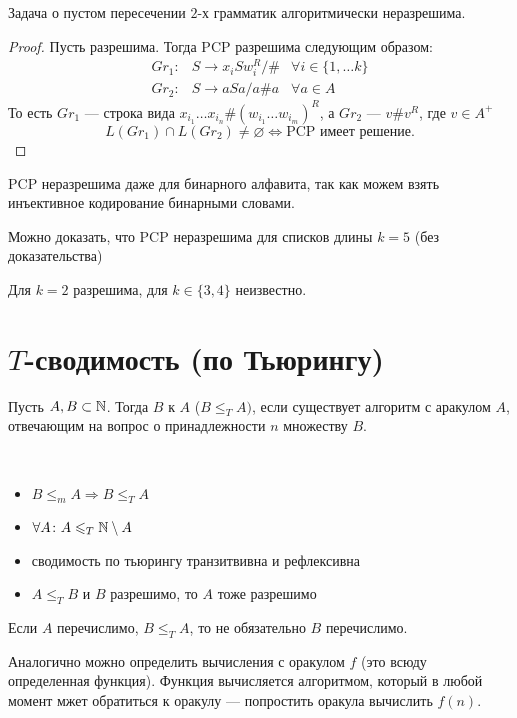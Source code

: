 \begin{cor}
    Задача о пустом пересечении $ 2$-х грамматик алгоритмически неразрешима.
\end{cor}
\begin{proof}
	Пусть разрешима. Тогда  PCP разрешима следующим образом:
	\[
	\begin{aligned}
		Gr_1 \colon& S \to  x_i S w_i^R / \# & \forall i \in \{1, \ldots k\} \\
		Gr_2 \colon& S \to  a S a / a\#a & \forall a \in A
	\end{aligned}
	\]
	То есть $ Gr_1$ --- строка вида $  x_{i_1} \ldots x_{i_n} \# (w_{i_1}\ldots w_{i_{m}})^{R}$, а  $ Gr_2$ --- $ v\#v ^{R}$, где $ v \in A^{+}$
	\[
		L(Gr_1) \cap L(Gr_2) \ne  \varnothing \Longleftrightarrow \text{PCP имеет решение}
	.\] 
\end{proof}

\begin{note}
    PCP неразрешима даже для бинарного алфавита, так как можем взять инъективное кодирование бинарными словами.
\end{note}
\begin{note}
	Можно доказать, что PCP неразрешима для списков длины $ k = 5$ (без доказательства)
\end{note}
\begin{note}
    Для $k= 2$ разрешима, для $ k \in \{3, 4\}$ неизвестно.
\end{note}

\section{$T$-сводимость (по Тьюрингу)}
\begin{defn} 
	Пусть $ A, B \subset \mathbb{N}$. Тогда $ B$  к $ A$ ($ B \le _{T}  A)$, если существует алгоритм с аракулом $ A$, отвечающим на вопрос о принадлежности  $ n $ множеству $ B$.
\end{defn}


\begin{prop}
	~\begin{itemize}
		\item $ B \le _{m} A \Longrightarrow B \le _T A$
		\item $ \forall A\colon  A \leqslant _{T} \mathbb{N} \setminus A $
		\item сводимость по тьюрингу транзитвивна и рефлексивна
		\item $ A \le _{T} B $ и $ B$ разрешимо, то $ A$ тоже разрешимо
    \end{itemize}
\end{prop}
\begin{proof*}
\end{proof*}
\begin{note}
	Если $ A$ перечислимо, $ B \le _{T} A$, то не обязательно $ B$ перечислимо. 
\end{note}


\begin{defn}
	Аналогично можно определить вычисления с оракулом $ f$ (это всюду определенная функция).
	Функция вычисляется алгоритмом, который в любой момент мжет обратиться к оракулу ---  попростить оракула вычислить $ f(n)$.
\end{defn}

